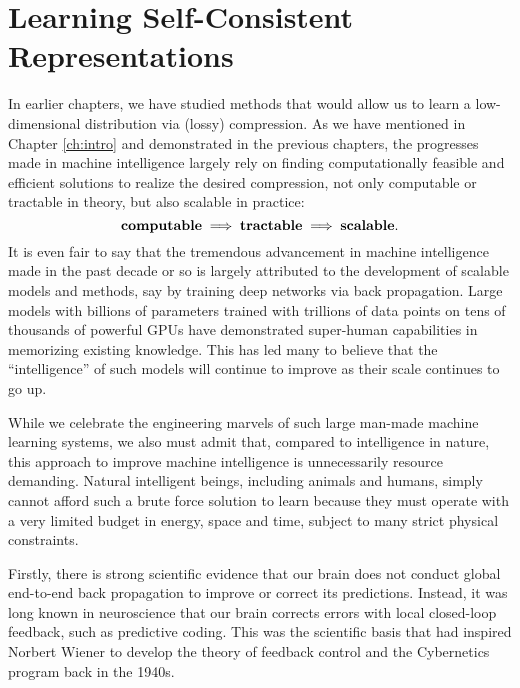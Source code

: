 \documentclass[../../book-main.tex]{subfiles}
\begin{document}

\section{Learning Self-Consistent Representations}
\label{sec:self-consistency}

In earlier chapters, we have studied methods that would allow us to learn a low-dimensional distribution via (lossy) compression. As we have mentioned in Chapter \ref{ch:intro} and demonstrated in the previous chapters, the progresses made in machine intelligence largely rely on finding computationally feasible and efficient solutions to realize the desired compression, not only computable or tractable in theory, but also scalable in practice:
\begin{equation}
\mbox{\textbf{computable}} \;
   \Longrightarrow \; \mbox{\textbf{tractable}} \; \Longrightarrow \; 
   \mbox{\textbf{scalable}}.
\end{equation}
It is even fair to say that the tremendous advancement in machine intelligence made in the past decade or so is largely attributed to the development of scalable models and methods, say by training deep networks via back propagation. Large models with billions of parameters trained with trillions of data points on tens of thousands of powerful GPUs have demonstrated super-human capabilities in memorizing existing knowledge. This has led many to believe that the ``intelligence'' of such models will continue to improve as their scale continues to go up. 

While we celebrate the engineering marvels of such large man-made machine learning  systems, we also must admit that, compared to intelligence in nature, this approach to improve machine intelligence is unnecessarily resource demanding. Natural intelligent beings, including animals and humans, simply cannot afford such a brute force solution to learn because they must operate with a very limited budget in energy, space and time, subject to many strict physical constraints. 

Firstly, there is strong scientific evidence that our brain does not conduct global end-to-end back propagation to improve or correct its predictions. Instead, it was long known in neuroscience that our brain corrects errors with local closed-loop feedback, such as predictive coding. This was the scientific basis that had inspired Norbert Wiener to develop the theory of feedback control and the Cybernetics program back in the 1940s. 
\end{document}

